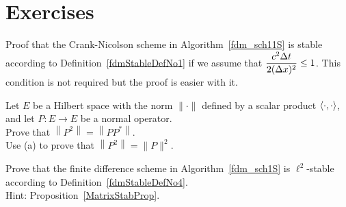 \section{Exercises}

\begin{question}
Proof that the Crank-Nicolson scheme in Algorithm~\ref{fdm_sch11S} is
stable according to Definition~\ref{fdmStableDefNo1} if we assume that
$\displaystyle \frac{c^2\Delta{t}}{2 (\Delta{x})^2} \leq 1$.  This condition is
not required but the proof is easier with it.
\label{fdmQ1}
\end{question}

\begin{question}
Let $E$ be a Hilbert space with the norm
$\|\cdot\|$ defined by a scalar product $\left\langle{\cdot} , {\cdot}\right\rangle$, and let
$P:E \to E$ be a normal operator.\\
 Prove that
$\displaystyle \left\|P^2 \right\| = \left\|P P^\ast\right\|$. \\
 Use (a) to prove that $\displaystyle \left\|P^2 \right\| = \|P\|^2$.
\label{fdmQ2}
\end{question}

\begin{question}
Prove that the finite difference scheme in Algorithm~\ref{fdm_sch1S}
is $\ell^2$-stable according to Definition~\ref{fdmStableDefNo4}.\\
Hint: Proposition~\ref{MatrixStabProp}.
\label{fdmQ3}
\end{question}


